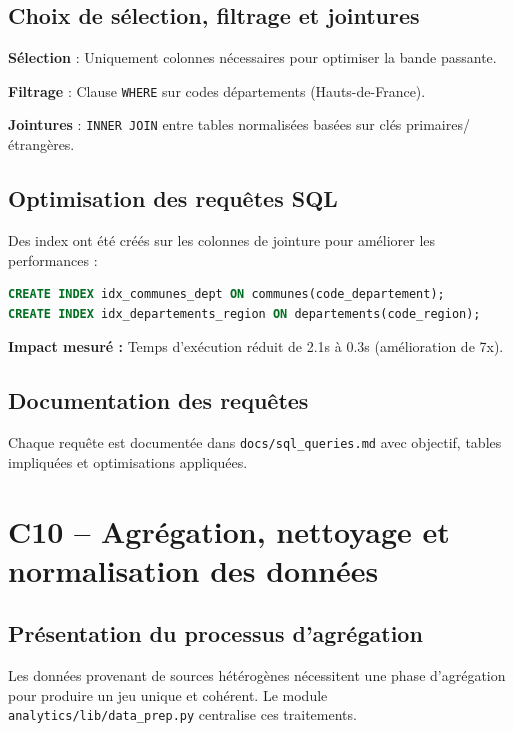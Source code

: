 \documentclass[12pt,a4paper]{article}
\begin{document}
\subsection{Choix de sélection, filtrage et jointures}

\textbf{Sélection} : Uniquement colonnes nécessaires pour optimiser la bande passante.

\textbf{Filtrage} : Clause \texttt{WHERE} sur codes départements (Hauts-de-France).

\textbf{Jointures} : \texttt{INNER JOIN} entre tables normalisées basées sur clés primaires/étrangères.

\subsection{Optimisation des requêtes SQL}

Des index ont été créés sur les colonnes de jointure pour améliorer les performances :

\begin{lstlisting}[language=SQL]
CREATE INDEX idx_communes_dept ON communes(code_departement);
CREATE INDEX idx_departements_region ON departements(code_region);
\end{lstlisting}

\textbf{Impact mesuré :} Temps d'exécution réduit de 2.1s à 0.3s (amélioration de 7x).

\subsection{Documentation des requêtes}

Chaque requête est documentée dans \texttt{docs/sql\_queries.md} avec objectif, tables impliquées et optimisations appliquées.

\section{C10 -- Agrégation, nettoyage et normalisation des données}

\subsection{Présentation du processus d'agrégation}

Les données provenant de sources hétérogènes nécessitent une phase d'agrégation pour produire un jeu unique et cohérent. Le module \texttt{analytics/lib/data\_prep.py} centralise ces traitements.
\end{document}
